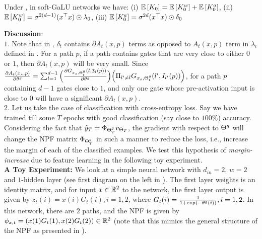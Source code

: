 \begin{lemma} Under , in soft-GaLU networks we have: (i) $\mathbb{E}\left[K_0\right]=\mathbb{E}\left[K^w_0\right]+\mathbb{E}\left[K^a_0\right]$, 
 (ii) $\mathbb{E}\left[K^w_0\right]=\sigma^{2(d-1)} (x^\top x)\odot \lambda_0$,  (iii) $\mathbb{E}\left[K^a_0\right]=\sigma^{2d}  (x^\top x)\odot \delta_0$
\end{lemma}
\textbf{Discussion}: \hfill\\
$1.$ Note that in , $\delta_t$ contains $\partial A_t(x,p)$ terms as opposed to $A_t(x,p)$ term in $\lambda_t$ defined in . For a path $p$, if a path contains gates that are very close to either $0$ or $1$, then $\partial A_t(x,p)$ will be very small. Since $\frac{\partial A_{t}(x_s,p)}{\partial \theta^g}= \sum_{l=1}^{d-1} \Big(\frac{\partial G_{x_s,{\Theta}^g_t}(l,\mathcal{I}_l(p))}{\partial \theta^g} \Big)\Big(\Pi_{l'\neq l} G_{x_s,{\Theta}^g_t}(l',I_{l'}(p))\Big)$, for a path $p$ containing $d-1$ gates close to $1$, and only one gate whose pre-activation input is close to $0$ will have a significant $\partial A_t(x,p)$. \hfill\\
$2.$ Let us take the case of classification with cross-entropy loss. Say we have trained till some $T$ epochs with good classification (say close to $100\%$) accuracy. Considering the fact that $\hat{y}_T=\Phi_{{\Theta}^g_T}v_{\Theta_T}$, the gradient with respect to ${\Theta}^g$ will change the NPF matrix $\Phi_{{\Theta}^g_T}$ in such a manner to reduce the loss, i.e., increase the margin of each of the classified examples. We test this hypothesis  of \emph{margin-increase} due to feature learning in the following toy experiment.\hfill\\
\textbf{A Toy Experiment:} We look at a simple neural network with $d_{in}=2$, $w=2$ and $1$-hidden layer (see first diagram on the left in ). The first layer weights is an identity matrix, and for input $x\in\mathbb{R}^2$ to the network, the first layer output is given by $z_{t}(i)=x(i)G_t(i),i=1,2$, where $G_t(i)=\frac{1}{1+\exp(-\theta^g(i))},i=1,2$. In this network, there are $2$ paths, and the NPF is given by $\phi_{x,t}=(x(1)G_t(1),x(2)G_t(2))\in \mathbb{R}^2$ (note that this mimics the general structure of the NPF as presented in ).
